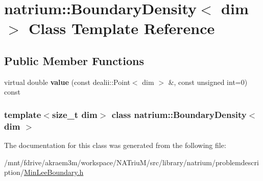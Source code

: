 \hypertarget{classnatrium_1_1BoundaryDensity}{
\section{natrium::BoundaryDensity$<$ dim $>$ Class Template Reference}
\label{classnatrium_1_1BoundaryDensity}
}
\subsection*{Public Member Functions}
\begin{DoxyCompactItemize}
\item 
\hypertarget{classnatrium_1_1BoundaryDensity_af8fcef848578f2e75d6aad467b38244f}{
virtual double {\bfseries value} (const dealii::Point$<$ dim $>$ \&, const unsigned int=0) const }
\label{classnatrium_1_1BoundaryDensity_af8fcef848578f2e75d6aad467b38244f}

\end{DoxyCompactItemize}
\subsubsection*{template$<$size\_\-t dim$>$ class natrium::BoundaryDensity$<$ dim $>$}



The documentation for this class was generated from the following file:\begin{DoxyCompactItemize}
\item 
/mnt/fdrive/akraem3m/workspace/NATriuM/src/library/natrium/problemdescription/\hyperlink{MinLeeBoundary_8h}{MinLeeBoundary.h}\end{DoxyCompactItemize}
